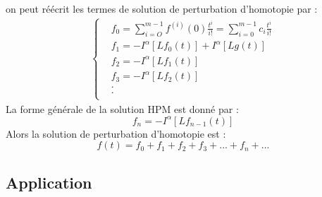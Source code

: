 on peut réécrit les termes de solution de perturbation d'homotopie par :
\begin{align*}
    \begin{cases}
        & f_0 = \sum_{i=O}^{m-1} f^{(i)}(0) \frac{t^i}{i!} = \sum _{i=0}^{m-1} c_i \frac{t^i}{i!} \\
          & f_1 = -I^{\alpha} [Lf_0(t)] + I^{\alpha}[Lg(t)]\\
          & f_2 = -I^{\alpha}[Lf_1(t)]\\
          & f_3 = -I^{\alpha}[Lf_2(t)]\\
          & .\\
          & .\\
    \end{cases}
  \end{align*}
La forme générale de la solution HPM est donné par :
\begin{equation}
    f_n=-I^{\alpha}[Lf_{n-1}(t)]
\end{equation}
Alors la solution de perturbation d'homotopie est :
\begin{equation}
    f(t)=f_0+f_1+f_2+f_3 + ... +f_n + ...
\end{equation}
\subsection{Application}
